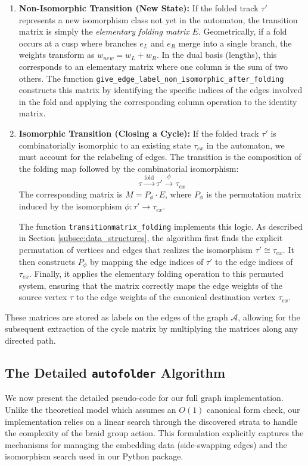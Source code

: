 \begin{enumerate}
    \item \textbf{Non-Isomorphic Transition (New State):}
    If the folded track $\tau'$ represents a new isomorphism class not yet in the automaton, the transition matrix is simply the \textit{elementary folding matrix} $E$.
    Geometrically, if a fold occurs at a cusp where branches $e_L$ and $e_R$ merge into a single branch, the weights transform as $w_{new} = w_L + w_R$. In the dual basis (lengths), this corresponds to an elementary matrix where one column is the sum of two others.
    The function \texttt{give\_edge\_label\_non\_isomorphic\_after\_folding} constructs this matrix by identifying the specific indices of the edges involved in the fold and applying the corresponding column operation to the identity matrix.

    \item \textbf{Isomorphic Transition (Closing a Cycle):}
    If the folded track $\tau'$ is combinatorially isomorphic to an existing state $\tau_{ex}$ in the automaton, we must account for the relabeling of edges. The transition is the composition of the folding map followed by the combinatorial isomorphism:
    \[
        \tau \xrightarrow{\text{fold}} \tau' \xrightarrow{\phi} \tau_{ex}
    \]
    The corresponding matrix is $M = P_\phi \cdot E$, where $P_\phi$ is the permutation matrix induced by the isomorphism $\phi: \tau' \to \tau_{ex}$.

    The function \texttt{transitionmatrix\_folding} implements this logic. As described in Section \ref{subsec:data_structures}, the algorithm first finds the explicit permutation of vertices and edges that realizes the isomorphism $\tau' \cong \tau_{ex}$. It then constructs $P_\phi$ by mapping the edge indices of $\tau'$ to the edge indices of $\tau_{ex}$. Finally, it applies the elementary folding operation to this permuted system, ensuring that the matrix correctly maps the edge weights of the source vertex $\tau$ to the edge weights of the canonical destination vertex $\tau_{ex}$.
\end{enumerate}

These matrices are stored as labels on the edges of the graph $\mathcal{A}$, allowing for the subsequent extraction of the cycle matrix by multiplying the matrices along any directed path.

\subsection{The Detailed \texttt{autofolder} Algorithm}
We now present the detailed pseudo-code for our full graph implementation. Unlike the theoretical model which assumes an $O(1)$ canonical form check, our implementation relies on a linear search through the discovered strata to handle the complexity of the braid group action. This formulation explicitly captures the mechanisms for managing the embedding data (side-swapping edges) and the isomorphism search used in our Python package.

